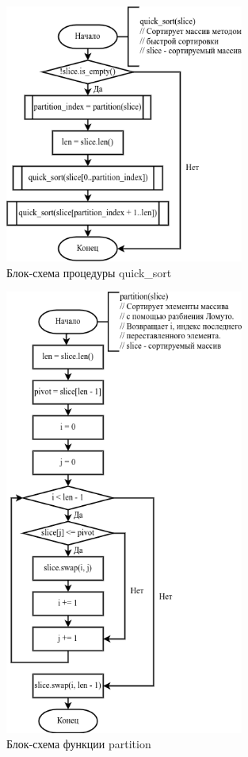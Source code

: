 \documentclass[14pt, a4paper]{extreport}
\begin{document}
\begin{figure}[H]
	\caption{Блок-схема процедуры quick\_sort}
	\label{fig:scheme-quicksort}
	\includegraphics[width=0.7\textwidth]{scheme-quicksort}
\end{figure}
\begin{figure}[H]
	\caption{Блок-схема функции partition}
	\label{fig:scheme-partition}
	\includegraphics[width=0.7\textwidth]{scheme-partition}
\end{figure}
\end{document}
